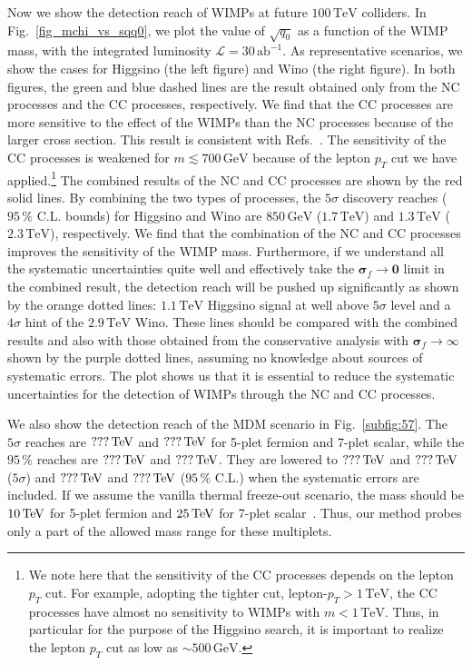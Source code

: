 \documentclass[12pt,twoside,book]{article}
\begin{document}
Now we show the detection reach of WIMPs at future $100\,\mathrm{TeV}$ colliders.
In Fig.~\ref{fig_mchi_vs_sqq0}, we plot the value of $\sqrt{q_0}$ as a function of the WIMP mass, with the integrated luminosity $\mathcal{L}=30\,\mathrm{ab}^{-1}$.
As representative scenarios, we show the cases for Higgsino (the left figure) and Wino (the right figure).
In both figures, the green and blue dashed lines are the result obtained only from the NC processes and the CC processes, respectively.
We find that the CC processes are more sensitive to the effect of the WIMPs than the NC processes because of the larger cross section.
This result is consistent with Refs.~\cite{DiLuzio:2018jwd,Matsumoto:2018ioi}.
The sensitivity of the CC processes is weakened for $m \lesssim 700\, \mathrm{GeV}$ because of the lepton $p_T$ cut we have applied.\footnote
{
  We note here that the sensitivity of the CC processes depends on the lepton $p_T$ cut.
  For example, adopting the tighter cut, lepton-$p_T > 1\,\mathrm{TeV}$, the CC processes have almost no sensitivity to WIMPs with $m < 1\,\mathrm{TeV}$.
  Thus, in particular for the purpose of the Higgsino search, it is important to realize the lepton $p_T$ cut as low as $\sim 500\, \mathrm{GeV}$.
}
The combined results of the NC and CC processes are shown by the red solid lines.
By combining the two types of processes, the $5\sigma$ discovery reaches ($95\,\%$ C.L. bounds) for Higgsino and Wino are $850\,\mathrm{GeV}$ ($1.7\,\mathrm{TeV}$) and $1.3\,\mathrm{TeV}$ ($2.3\,\mathrm{TeV}$), respectively.
We find that the combination of the NC and CC processes improves the sensitivity of the WIMP mass.
Furthermore, if we understand all the systematic uncertainties quite well and effectively take the $\bm{\sigma}_f \to \bm{0}$ limit in the combined result, the detection reach will be pushed up significantly as shown by the orange dotted lines: $1.1\,\mathrm{TeV}$ Higgsino signal at well above $5\sigma$ level and a $4\sigma$ hint of the $2.9\,\mathrm{TeV}$ Wino.
These lines should be compared with the combined results and also with those obtained from the conservative analysis with $\bm{\sigma}_f \to \infty$ shown by the purple dotted lines, assuming no knowledge about sources of systematic errors.
The plot shows us that it is essential to reduce the systematic uncertainties for the detection of WIMPs through the NC and CC processes.

We also show the detection reach of the MDM scenario in Fig.~\ref{subfig:57}.
The $5\sigma$ reaches are $???\,{\rm TeV}$ and $???\,{\rm TeV}$ for 5-plet fermion and 7-plet scalar, while the $95\,\%$ reaches are $???\,{\rm TeV}$ and $???\,{\rm TeV}$.
They are lowered to $???\,{\rm TeV}$ and $???\,{\rm TeV}$ ($5\sigma$) and $???\,{\rm TeV}$ and $???\,{\rm TeV}$ ($95\,\%$ C.L.) when the systematic errors are included.
If we assume the vanilla thermal freeze-out scenario, the mass should be $10\,{\rm TeV}$ for 5-plet fermion and $25\,{\rm TeV}$ for 7-plet scalar~\cite{Cirelli:2007xd}.
Thus, our method probes only a part of the allowed mass range for these multiplets.
\end{document}
